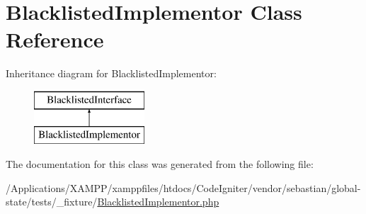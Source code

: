 \hypertarget{class_sebastian_bergmann_1_1_global_state_1_1_test_fixture_1_1_blacklisted_implementor}{}\section{Blacklisted\+Implementor Class Reference}
\label{class_sebastian_bergmann_1_1_global_state_1_1_test_fixture_1_1_blacklisted_implementor}
Inheritance diagram for Blacklisted\+Implementor\+:\begin{figure}[H]
\begin{center}
\leavevmode
\includegraphics[height=2.000000cm]{class_sebastian_bergmann_1_1_global_state_1_1_test_fixture_1_1_blacklisted_implementor}
\end{center}
\end{figure}


The documentation for this class was generated from the following file\+:\begin{DoxyCompactItemize}
\item 
/\+Applications/\+X\+A\+M\+P\+P/xamppfiles/htdocs/\+Code\+Igniter/vendor/sebastian/global-\/state/tests/\+\_\+fixture/\mbox{\hyperlink{_blacklisted_implementor_8php}{Blacklisted\+Implementor.\+php}}\end{DoxyCompactItemize}
